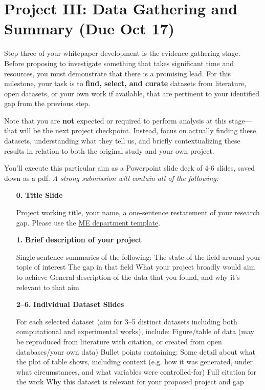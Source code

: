 \section*{Project III: Data Gathering and Summary (Due Oct 17)}

Step three of your whitepaper development is the evidence gathering stage. 
Before proposing to investigate something that takes significant time and resources, you must demonstrate that there is a promising lead.  
For this milestone, your task is to \textbf{find, select, and curate} datasets from literature, open datasets, or your own work if available, that are pertinent to your identified gap from the previous step.

Note that you are \textbf{not} expected or required to perform analysis at this stage---that will be the next project checkpoint. 
Instead, focus on actually finding these datasets, understanding what they tell us, and briefly contextualizing these results in relation to both the original study and your own project. 

You'll execute this particular aim as a Powerpoint slide deck of 4-6 slides, saved down as a pdf. \textit{A strong submission will contain all of the following:}


\renewcommand{\outlinei}{itemize}
\begin{enumerate}
\item[\textbf{0.}] \textbf{Title Slide}
\begin{outline}
\1 Project working title, your name, a one-sentence restatement of your research gap. Please use the \hyperlink{https://me.engin.umich.edu/student-intranet/}{ME department template}. 
\end{outline}
\item[\textbf{1.}] \textbf{Brief description of your project}
\begin{outline}
\1 Single sentence summaries of the following:
\2 The state of the field around your topic of interest
\2 The gap in that field
\2 What your project broadly would aim to achieve%
\2 General description of the data that you found, and why it's relevant to that aim
\end{outline}
\item[\textbf{2--6.}] \textbf{Individual Dataset Slides}
\begin{outline}
\1 For each selected dataset (aim for 3--5 distinct datasets including both computational and experimental works), include:
\2 Figure/table of data (may be reproduced from literature with citation, or created from open databases/your own data)
\2 Bullet points containing:
\3 Some detail about what the plot of table shows, including context (e.g. how it was generated, under what circumstances, and what variables were controlled-for)
\3 Full citation for the work
\3 Why this dataset is relevant for your proposed project and gap
\end{outline}
\end{enumerate}


